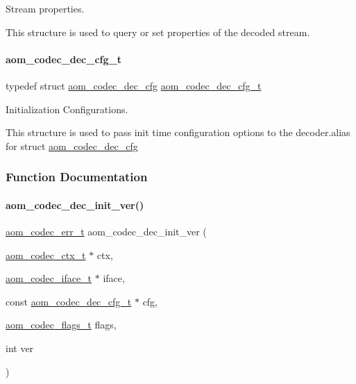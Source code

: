 Stream properties. 

This structure is used to query or set properties of the decoded stream. \mbox{\label{group__decoder_ga629c80380a9351796022345f655a5f3d}} 
\paragraph{\texorpdfstring{aom\+\_\+codec\+\_\+dec\+\_\+cfg\+\_\+t}{aom\_codec\_dec\_cfg\_t}}
{\footnotesize\ttfamily typedef struct \hyperlink{structaom__codec__dec__cfg}{aom\+\_\+codec\+\_\+dec\+\_\+cfg}  \hyperlink{group__decoder_ga629c80380a9351796022345f655a5f3d}{aom\+\_\+codec\+\_\+dec\+\_\+cfg\+\_\+t}}



Initialization Configurations. 

This structure is used to pass init time configuration options to the decoder.\+alias for struct \hyperlink{structaom__codec__dec__cfg}{aom\+\_\+codec\+\_\+dec\+\_\+cfg} 

\subsubsection{Function Documentation}
\mbox{\label{group__decoder_gab2bfd2f5517b9452d2c71b7c2b2e8e8d}} 
\paragraph{\texorpdfstring{aom\+\_\+codec\+\_\+dec\+\_\+init\+\_\+ver()}{aom\_codec\_dec\_init\_ver()}}
{\footnotesize\ttfamily \hyperlink{group__codec_gaaae61e0f8663e6137f1e228757248e7c}{aom\+\_\+codec\+\_\+err\+\_\+t} aom\+\_\+codec\+\_\+dec\+\_\+init\+\_\+ver (\begin{DoxyParamCaption}\item[{\hyperlink{group__codec_ga9a1d27f9742d9f70783e3c6cb849b5b4}{aom\+\_\+codec\+\_\+ctx\+\_\+t} $\ast$}]{ctx,  }\item[{\hyperlink{group__codec_ga4ef55b44c762836d1550e11921bed403}{aom\+\_\+codec\+\_\+iface\+\_\+t} $\ast$}]{iface,  }\item[{const \hyperlink{group__decoder_ga629c80380a9351796022345f655a5f3d}{aom\+\_\+codec\+\_\+dec\+\_\+cfg\+\_\+t} $\ast$}]{cfg,  }\item[{\hyperlink{group__codec_ga18f2242c1afca329581fbd3f2c81721b}{aom\+\_\+codec\+\_\+flags\+\_\+t}}]{flags,  }\item[{int}]{ver }\end{DoxyParamCaption})}



